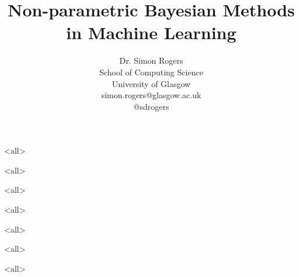 \documentclass{beamer}
\title{Non-parametric Bayesian Methods in Machine Learning}
\author{Dr. Simon Rogers\\School of Computing Science\\University of Glasgow\\simon.rogers@glasgow.ac.uk\\@sdrogers}
\begin{document}
\mode<all>

\begin{frame}
	\titlepage
\end{frame}

\mode<all>



\mode<all>



\mode<all>



\mode<all>


\mode<all>


\mode<all>

\end{document}
